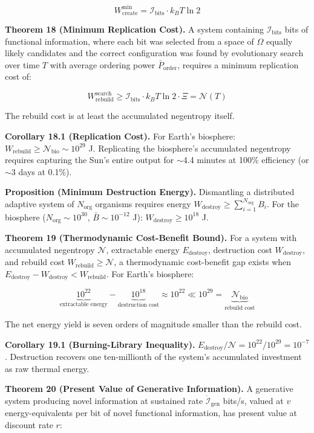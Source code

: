 \documentclass[11pt]{article}
\begin{document}
\[W_{\text{create}}^{\min} = \mathcal{I}_{\text{bits}} \cdot k_B T \ln 2\]

\textbf{Theorem 18 (Minimum Replication Cost).} A system containing
\(\mathcal{I}_{\text{bits}}\) bits of functional information, where each
bit was selected from a space of \(\Omega\) equally likely candidates
and the correct configuration was found by evolutionary search over time
\(T\) with average ordering power \(\bar{P}_{\text{order}}\), requires a
minimum replication cost of:

\[W_{\text{rebuild}}^{\text{search}} \geq \mathcal{I}_{\text{bits}} \cdot k_B T \ln 2 \cdot \Xi = \mathcal{N}(T)\]

The rebuild cost is at least the accumulated negentropy itself.

\textbf{Corollary 18.1 (Replication Cost).} For Earth's biosphere:
\(W_{\text{rebuild}} \geq \mathcal{N}_{\text{bio}} \sim 10^{29}\) J.
Replicating the biosphere's accumulated negentropy requires capturing
the Sun's entire output for $\sim$4.4 minutes at 100\% efficiency (or
$\sim$3 days at 0.1\%).

\textbf{Proposition (Minimum Destruction Energy).} Dismantling a
distributed adaptive system of \(N_{\text{org}}\) organisms requires
energy \(W_{\text{destroy}} \geq \sum_{i=1}^{N_{\text{org}}} B_i\). For
the biosphere (\(N_{\text{org}} \sim 10^{30}\),
\(\bar{B} \sim 10^{-12}\) J): \(W_{\text{destroy}} \geq 10^{18}\) J.

\textbf{Theorem 19 (Thermodynamic Cost-Benefit Bound).} For a system
with accumulated negentropy \(\mathcal{N}\), extractable energy
\(E_{\text{destroy}}\), destruction cost \(W_{\text{destroy}}\), and
rebuild cost \(W_{\text{rebuild}} \geq \mathcal{N}\), a thermodynamic
cost-benefit gap exists when
\(E_{\text{destroy}} - W_{\text{destroy}} < W_{\text{rebuild}}\). For
Earth's biosphere:

\[\underbrace{10^{22}}_{\text{extractable energy}} - \underbrace{10^{18}}_{\text{destruction cost}} \approx 10^{22} \ll 10^{29} = \underbrace{\mathcal{N}_{\text{bio}}}_{\text{rebuild cost}}\]

The net energy yield is seven orders of magnitude smaller than the
rebuild cost.

\textbf{Corollary 19.1 (Burning-Library Inequality).}
\(E_{\text{destroy}} / \mathcal{N} = 10^{22} / 10^{29} = 10^{-7}\).
Destruction recovers one ten-millionth of the system's accumulated
investment as raw thermal energy.

\textbf{Theorem 20 (Present Value of Generative Information).} A
generative system producing novel information at sustained rate
\(\dot{\mathcal{I}}_{\text{gen}}\) bits/s, valued at \(v\)
energy-equivalents per bit of novel functional information, has present
value at discount rate \(r\):
\end{document}
